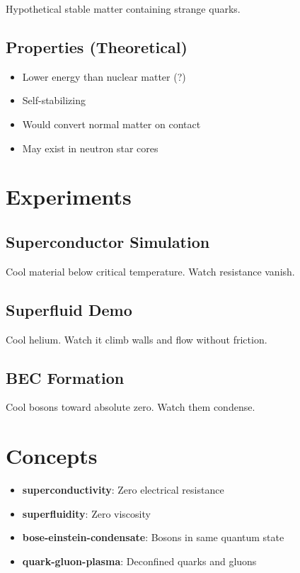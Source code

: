 \documentclass[
  11pt,
  letterpaper,
  twoside,
  openright]{book}
\providecommand{\tightlist}{%
  \setlength{\itemsep}{0pt}\setlength{\parskip}{0pt}}
\begin{document}
Hypothetical stable matter containing strange quarks.

\subsection{Properties (Theoretical)}\label{properties-theoretical}

\begin{itemize}
\tightlist
\item
  Lower energy than nuclear matter (?)
\item
  Self-stabilizing
\item
  Would convert normal matter on contact
\item
  May exist in neutron star cores
\end{itemize}

\section{Experiments}\label{experiments-10}

\subsection{Superconductor Simulation}\label{superconductor-simulation}

Cool material below critical temperature. Watch resistance vanish.

\subsection{Superfluid Demo}\label{superfluid-demo}

Cool helium. Watch it climb walls and flow without friction.

\subsection{BEC Formation}\label{bec-formation}

Cool bosons toward absolute zero. Watch them condense.

\section{Concepts}\label{concepts-10}

\begin{itemize}
\tightlist
\item
  \textbf{superconductivity}: Zero electrical resistance
\item
  \textbf{superfluidity}: Zero viscosity
\item
  \textbf{bose-einstein-condensate}: Bosons in same quantum state
\item
  \textbf{quark-gluon-plasma}: Deconfined quarks and gluons
\end{itemize}
\end{document}
